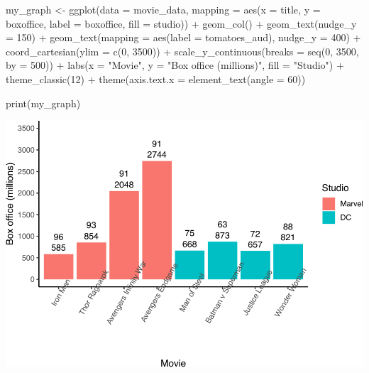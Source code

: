 \documentclass[
]{krantz}
\makeatletter
\newenvironment{Shaded}{\begin{snugshade}}{\end{snugshade}}
\newcommand{\AttributeTok}[1]{\textcolor[rgb]{0.61,0.61,0.61}{#1}}
\newcommand{\DecValTok}[1]{\textcolor[rgb]{0.06,0.06,0.06}{#1}}
\newcommand{\FunctionTok}[1]{\textcolor[rgb]{0,0,0}{#1}}
\newcommand{\NormalTok}[1]{#1}
\newcommand{\OtherTok}[1]{\textcolor[rgb]{0.37,0.37,0.37}{#1}}
\newcommand{\SpecialCharTok}[1]{\textcolor[rgb]{0,0,0}{#1}}
\newcommand{\StringTok}[1]{\textcolor[rgb]{0.5,0.5,0.5}{#1}}
\newenvironment{kframe}{%
\medskip{}
\setlength{\fboxsep}{.8em}
 \def\at@end@of@kframe{}%
 \ifinner\ifhmode%
  \def\at@end@of@kframe{\end{minipage}}%
  \begin{minipage}{\columnwidth}%
 \fi\fi%
 \def\FrameCommand##1{\hskip\@totalleftmargin \hskip-\fboxsep
 \colorbox{shadecolor}{##1}\hskip-\fboxsep
     \hskip-\linewidth \hskip-\@totalleftmargin \hskip\columnwidth}%
 \MakeFramed {\advance\hsize-\width
   \@totalleftmargin\z@ \linewidth\hsize
   \@setminipage}}%
 {\par\unskip\endMakeFramed%
 \at@end@of@kframe}
\renewenvironment{Shaded}{\begin{kframe}}{\end{kframe}}
\makeatother
\begin{document}
\begin{Shaded}
\begin{Highlighting}[]
\NormalTok{my\_graph }\OtherTok{\textless{}{-}} \FunctionTok{ggplot}\NormalTok{(}\AttributeTok{data =}\NormalTok{ movie\_data,}
           \AttributeTok{mapping =} \FunctionTok{aes}\NormalTok{(}\AttributeTok{x =}\NormalTok{ title,}
                         \AttributeTok{y =}\NormalTok{ boxoffice,}
                         \AttributeTok{label =}\NormalTok{ boxoffice, }
                         \AttributeTok{fill =}\NormalTok{ studio)) }\SpecialCharTok{+}
  \FunctionTok{geom\_col}\NormalTok{() }\SpecialCharTok{+}
  \FunctionTok{geom\_text}\NormalTok{(}\AttributeTok{nudge\_y =} \DecValTok{150}\NormalTok{)  }\SpecialCharTok{+}
  \FunctionTok{geom\_text}\NormalTok{(}\AttributeTok{mapping =} \FunctionTok{aes}\NormalTok{(}\AttributeTok{label =}\NormalTok{ tomatoes\_aud), }
            \AttributeTok{nudge\_y =} \DecValTok{400}\NormalTok{) }\SpecialCharTok{+}
  \FunctionTok{coord\_cartesian}\NormalTok{(}\AttributeTok{ylim =} \FunctionTok{c}\NormalTok{(}\DecValTok{0}\NormalTok{, }\DecValTok{3500}\NormalTok{)) }\SpecialCharTok{+}
  \FunctionTok{scale\_y\_continuous}\NormalTok{(}\AttributeTok{breaks =} \FunctionTok{seq}\NormalTok{(}\DecValTok{0}\NormalTok{, }\DecValTok{3500}\NormalTok{, }\AttributeTok{by =} \DecValTok{500}\NormalTok{)) }\SpecialCharTok{+}
  \FunctionTok{labs}\NormalTok{(}\AttributeTok{x =} \StringTok{"Movie"}\NormalTok{,}
       \AttributeTok{y =} \StringTok{"Box office (millions)"}\NormalTok{,}
       \AttributeTok{fill =} \StringTok{"Studio"}\NormalTok{) }\SpecialCharTok{+}
  \FunctionTok{theme\_classic}\NormalTok{(}\DecValTok{12}\NormalTok{) }\SpecialCharTok{+}
  \FunctionTok{theme}\NormalTok{(}\AttributeTok{axis.text.x =} \FunctionTok{element\_text}\NormalTok{(}\AttributeTok{angle =} \DecValTok{60}\NormalTok{))}

\FunctionTok{print}\NormalTok{(my\_graph)}
\end{Highlighting}
\end{Shaded}

\includegraphics[width=0.65\linewidth]{bookdown_files/figure-latex/unnamed-chunk-214-1}
\end{document}

